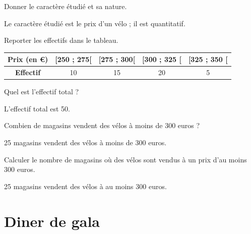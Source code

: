 \documentclass[a4paper,11pt]{exam}
\begin{document}
	\begin{questions} %
		
		\question Donner le caractère étudié et sa nature.
		\begin{solution}
			Le caractère étudié est le prix d'un vélo ; il est quantitatif.
		\end{solution}
		
		\question Reporter les effectifs dans le tableau.
		\begin{solution}
			
				\begin{tabular}{|@{\ }c@{\ }|@{\ }c@{\ }|@{\ }c@{\ }|@{\ }c@{\ }|@{\ }c@{\ }|}
					\hline
					\textbf{Prix} (en €) & [250 ; 275[ & [275 ; 300[ & [300 ; 325 [  & [325 ; 350 [\\
					\hline
					\textbf{Effectif} & 10 & 15  & 20 &  5\\
					\hline 
				\end{tabular}
			
		\end{solution}
		
		\question Quel est l'effectif total ?
		\begin{solution}
			L'effectif total est 50.
		\end{solution}
		
		\question Combien de magasins vendent des vélos à moins de 300 euros ?
		\begin{solution}
			25 magasins vendent des vélos à moins de 300 euros.
		\end{solution}
		
		\question Calculer le nombre de magasins où des vélos sont vendus à un prix d'au moins 300 euros.
		\begin{solution}
			25 magasins vendent des vélos à au moins 300 euros.
		\end{solution}
	\end{questions}

\newpage

\section{Diner de gala}
\end{document}
